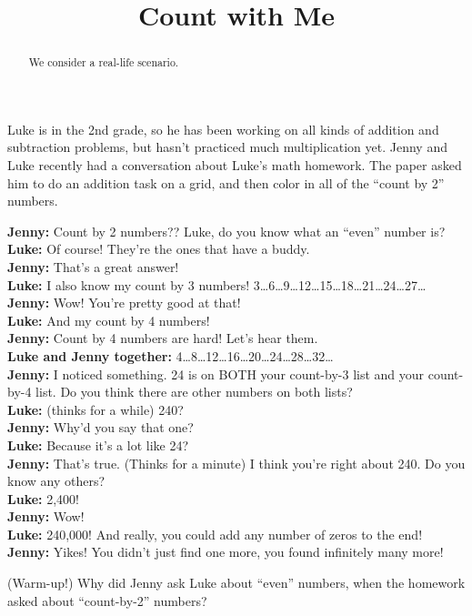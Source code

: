 \documentclass[nooutcomes,noauthor,handout]{ximera}
\title{Count with Me}
\begin{document}
\begin{abstract} We consider a real-life scenario. \end{abstract}
\maketitle

Luke is in the 2nd grade, so he has been working on all kinds of addition and subtraction problems, but hasn't practiced much multiplication yet. Jenny and Luke recently had a conversation about Luke’s math homework. The paper asked him to do an addition task on a grid, and then color in all of the ``count by 2'' numbers.

{\bf Jenny:} Count by 2 numbers?? Luke, do you know what an ``even'' number is?\\
{\bf Luke:} Of course! They’re the ones that have a buddy.\\
{\bf Jenny:} That’s a great answer!\\
{\bf Luke:} I also know my count by 3 numbers! 3…6…9…12…15…18…21…24…27…\\
{\bf Jenny:} Wow! You’re pretty good at that!\\
{\bf Luke:} And my count by 4 numbers!\\
{\bf Jenny:} Count by 4 numbers are hard! Let’s hear them.\\
{\bf Luke and Jenny together:} 4…8…12…16…20…24…28…32…\\
{\bf Jenny:} I noticed something. 24 is on BOTH your count-by-3 list and your count-by-4 list. Do you think there are other numbers on both lists?\\
{\bf Luke:} (thinks for a while) 240?\\
{\bf Jenny:} Why’d you say that one?\\
{\bf Luke:} Because it’s a lot like 24?\\
{\bf Jenny:} That’s true. (Thinks for a minute) I think you’re right about 240. Do you know any others?\\
{\bf Luke:} 2,400! \\
{\bf Jenny:} Wow!\\
{\bf Luke:} 240,000! And really, you could add any number of zeros to the end!\\
{\bf Jenny:} Yikes! You didn’t just find one more, you found infinitely many more!\\


\begin{problem} (Warm-up!) Why did Jenny ask Luke about ``even'' numbers, when the homework asked about ``count-by-2'' numbers?
\end{problem}
\end{document}
